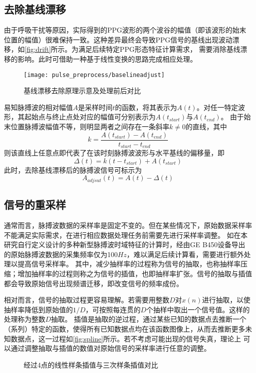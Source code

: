 \subsection{去除基线漂移}
由于呼吸干扰等原因，实际得到的PPG波形的两个波谷的幅值（即该波形的始末位置的幅值）很难保持一致。这种差异最终会导致PPG信号的基线出现波动漂移，如\autoref{fig:drift}所示。为满足后续特定PPG形态特征计算需求，
需要消除基线漂移的影响。此时可借助一种基于线性变换的思路完成相应处理。
\begin{figure}[htbp]
    \centering
    \texttt{[image: pulse\_preprocess/baselineadjust]}
    \caption{\label{fig:drift}基线漂移去除原理示意及处理前后对比}
\end{figure}

易知脉搏波的相对幅值$A$是采样时间$t$的函数，将其表示为$A(t)$。对任一特定波形，其起始点与终止点处对应的幅值可分别表示为$A(t_{start})$与$A(t_{end})$。
由于始末位置脉搏波幅值不等，则明显两者之间存在一条斜率$k \ne 0$的直线，其中
\begin{equation}
    \label{equ:linek}
    k=\frac{A(t_{start})-A(t_{end})}{t_{start}-t_{end}}
\end{equation}
则该直线上任意点即代表了在该时刻脉搏波波形与水平基线的偏移量，即
\begin{equation}
    \label{equ:liney}
    \Delta(t)=k(t-t_{start})+A(t_{start})
\end{equation}
此时，去除基线漂移后的脉搏波信号可标示为
\begin{equation}
    \label{equ:adjusta}
    A_{adjsut}(t)=A(t)-\Delta(t)
\end{equation}

\subsection{信号的重采样}
通常而言，脉搏波数据的采样率是固定不变的。但在某些情况下，原始数据采样率不能满足实际需求，在进行相应数据处理任务前需要先进行采样率调整。
如在本研究自行定义设计的多种新型脉搏波时域特征的计算时，经由GE B450设备导出的原始脉搏波数据的采集频率仅为100$Hz$，难以满足后续计算看，需要进行额外处理以提高信号采样率。
其中，减少抽样率的过程称为信号的抽取，也称抽样率压缩；增加抽样率的过程则称之为信号的插值，也即抽样率扩张\cite{Cheng2008}。信号的抽取与插值都会导致原始信号出现频谱迁移，即改变信号的频率成份\cite{Cheng2008}。

相对而言，信号的抽取过程更容易理解。若需要用整数$D$对$x(n)$进行抽取，以使抽样率降低到原始值的$1/D$，可按照每连贯的$D$个抽样中取出一个信号值。这样的处理称为整数$D$抽取\cite{Cheng2008}。
插值是抽取的逆过程，通过某些已知的数据点去推断一个（系列）特定的函数，使得所有已知数据点均在该函数图像上，从而去推断更多未知数据点，这一过程如\autoref{fig:spline}所示。若不考虑可能出现的信号失真，理论上
可以通过调整抽取与插值的数值对原始信号的采样率进行任意的调整。
\begin{figure}[htbp]
    \centering
    \quad
    \caption{\label{fig:spline}经过4点的线性样条插值与三次样条插值对比}
\end{figure}

